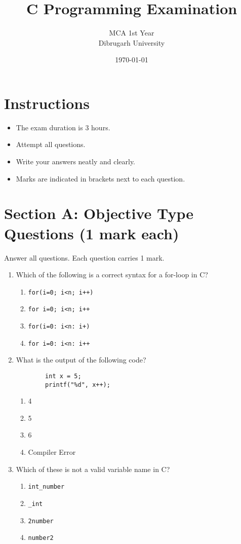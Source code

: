 \documentclass[12pt, a4paper]{article}
\title{\textbf{C Programming Examination}}
\author{MCA 1st Year \\ Dibrugarh University}
\date{\today}
\begin{document}
\maketitle


\section*{Instructions}
\begin{itemize}
    \item The exam duration is 3 hours.
    \item Attempt all questions.
    \item Write your answers neatly and clearly.
    \item Marks are indicated in brackets next to each question.
\end{itemize}



    
\section*{Section A: Objective Type Questions (1 mark each)}
Answer all questions. Each question carries 1 mark.

\begin{enumerate}
    \item Which of the following is a correct syntax for a for-loop in C?
    \begin{enumerate}
        \item \texttt{for(i=0; i<n; i++)}
        \item \texttt{for i=0; i<n; i++}
        \item \texttt{for(i=0: i<n: i+)}
        \item \texttt{for i=0: i<n: i++}
    \end{enumerate}

    \item What is the output of the following code?
    \begin{verbatim}
        int x = 5;
        printf("%d", x++);
    \end{verbatim}
    \begin{enumerate}
        \item 4
        \item 5
        \item 6
        \item Compiler Error
    \end{enumerate}

    \item Which of these is not a valid variable name in C?
    \begin{enumerate}
        \item \texttt{int\_number}
        \item \texttt{\_int}
        \item \texttt{2number}
        \item \texttt{number2}
    \end{enumerate}

  
\end{enumerate}
\end{document}
